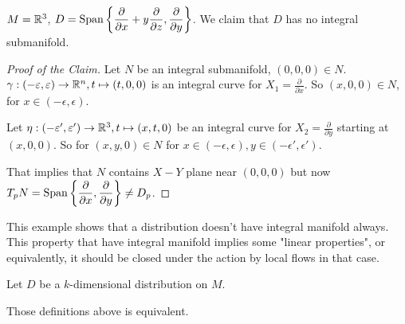 \begin{example}
     $ M=\mathbb R^3 $,  $ D=\mathrm{Span}\left\{\displaystyle\frac{\partial}{\partial x}+y\frac{\partial }{\partial z},\frac{\partial }{\partial y}\right\} $. We claim that  $ D  $ has no integral submanifold.  
    
\end{example}
\begin{proof}[Proof of the Claim]
    Let  $ N  $ be an integral submanifold,  $ (0,0,0)\in N $.  $ \gamma:
    (-\varepsilon,\varepsilon)\rightarrow \mathbb R^n,t\mapsto (t,0,0) $ is an  integral curve for  $ X_1=\frac{\partial}{\partial x}$. So  $ (x,0,0)\in N $, for  $ x\in (-\epsilon,\epsilon) $.
    
    Let  $ \eta:(-\varepsilon',\varepsilon')\rightarrow \mathbb R^3,t\mapsto (x,t,0) $ be an integral curve for  $ X_2=\frac{\partial}{\partial y} $ starting at  $ (x,0,0) $. So for  $ (x,y,0) \in N$ for  $ x\in(-\epsilon,\epsilon),y\in(-\epsilon',\epsilon') $.
    
    That implies that  $ N  $ contains  $ X-Y $ plane near  $ (0,0,0) $ but now  $ T_pN=\mathrm{Span}\displaystyle\left\{\frac{\partial }{\partial x},\frac{\partial}{\partial y}\right\}\neq D_p $.   
\end{proof}
\begin{remark}
    This example shows that a distribution doesn't have integral manifold always. This property that have integral manifold implies some "linear properties", or equivalently, it should be closed under the action by local flows in that case.
\end{remark}
\begin{definition}
    Let  $ D  $ be a  $ k $-dimensional distribution on  $ M $.
    
\end{definition}
\begin{theorem}\label{thm:local-frobenius}
    Those definitions above is equivalent.
\end{theorem}